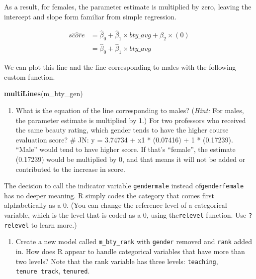 \documentclass[]{article}
\newenvironment{Shaded}{\begin{snugshade}}{\end{snugshade}}
\newcommand{\KeywordTok}[1]{\textcolor[rgb]{0.13,0.29,0.53}{\textbf{#1}}}
\newcommand{\NormalTok}[1]{#1}
\providecommand{\tightlist}{%
  \setlength{\itemsep}{0pt}\setlength{\parskip}{0pt}}
\begin{document}
As a result, for females, the parameter estimate is multiplied by zero,
leaving the intercept and slope form familiar from simple regression.

\[
  \begin{aligned}
\widehat{score} &= \hat{\beta}_0 + \hat{\beta}_1 \times bty\_avg + \hat{\beta}_2 \times (0) \\
&= \hat{\beta}_0 + \hat{\beta}_1 \times bty\_avg\end{aligned}
\]

We can plot this line and the line corresponding to males with the
following custom function.

\begin{Shaded}
\begin{Highlighting}[]
\KeywordTok{multiLines}\NormalTok{(m_bty_gen)}
\end{Highlighting}
\end{Shaded}

\begin{enumerate}
\def\labelenumi{\arabic{enumi}.}
\setcounter{enumi}{8}
\tightlist
\item
  What is the equation of the line corresponding to males? (\emph{Hint:}
  For males, the parameter estimate is multiplied by 1.) For two
  professors who received the same beauty rating, which gender tends to
  have the higher course evaluation score? \# JN: y = 3.74734 + x1 *
  (0.07416) + 1 * (0.17239). ``Male'' would tend to have higher score.
  If that's ``female'', the estimate (0.17239) would be multiplied by 0,
  and that means it will not be added or contributed to the increase in
  score.
\end{enumerate}

The decision to call the indicator variable \texttt{gendermale} instead
of\texttt{genderfemale} has no deeper meaning. R simply codes the
category that comes first alphabetically as a \(0\). (You can change the
reference level of a categorical variable, which is the level that is
coded as a 0, using the\texttt{relevel} function. Use \texttt{?relevel}
to learn more.)

\begin{enumerate}
\def\labelenumi{\arabic{enumi}.}
\setcounter{enumi}{9}
\tightlist
\item
  Create a new model called \texttt{m\_bty\_rank} with \texttt{gender}
  removed and \texttt{rank} added in. How does R appear to handle
  categorical variables that have more than two levels? Note that the
  rank variable has three levels: \texttt{teaching},
  \texttt{tenure\ track}, \texttt{tenured}.
\end{enumerate}
\end{document}
